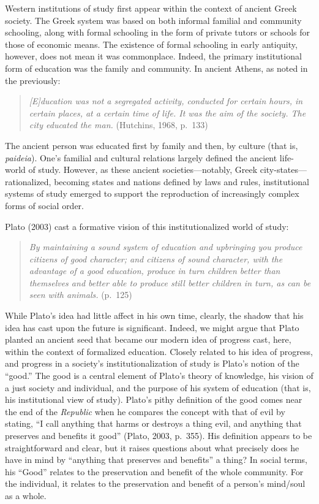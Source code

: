 \documentclass[
]{book}
\begin{document}
Western institutions of study first appear within the context of ancient Greek society. The Greek system was based on both informal familial and community schooling, along with formal schooling in the form of private tutors or schools for those of economic means. The existence of formal schooling in early antiquity, however, does not mean it was commonplace. Indeed, the primary institutional form of education was the family and community. In ancient Athens, as noted in the previously:

\begin{quote}
\emph{{[}E{]}ducation was not a segregated activity, conducted for certain hours, in certain places, at a certain time of life. It was the aim of the society. The city educated the man.} (Hutchins, 1968, p.~133)
\end{quote}

The ancient person was educated first by family and then, by culture (that is, \emph{paideia}). One's familial and cultural relations largely defined the ancient life-world of study. However, as these ancient societies---notably, Greek city-states---rationalized, becoming states and nations defined by laws and rules, institutional systems of study emerged to support the reproduction of increasingly complex forms of social order.

Plato (2003) cast a formative vision of this institutionalized world of study:

\begin{quote}
\emph{By maintaining a sound system of education and upbringing you produce citizens of good character; and citizens of sound character, with the advantage of a good education, produce in turn children better than themselves and better able to produce still better children in turn, as can be seen with animals.} (p.~125)
\end{quote}

While Plato's idea had little affect in his own time, clearly, the shadow that his idea has cast upon the future is significant. Indeed, we might argue that Plato planted an ancient seed that became our modern idea of progress cast, here, within the context of formalized education. Closely related to his idea of progress, and progress in a society's institutionalization of study is Plato's notion of the ``good.'' The good is a central element of Plato's theory of knowledge, his vision of a just society and individual, and the purpose of his system of education (that is, his institutional view of study). Plato's pithy definition of the good comes near the end of the \emph{Republic} when he compares the concept with that of evil by stating, ``I call anything that harms or destroys a thing evil, and anything that preserves and benefits it good'' (Plato, 2003, p.~355). His definition appears to be straightforward and clear, but it raises questions about what precisely does he have in mind by ``anything that preserves and benefits'' a thing? In social terms, his ``Good'' relates to the preservation and benefit of the whole community. For the individual, it relates to the preservation and benefit of a person's mind/soul as a whole.
\end{document}
